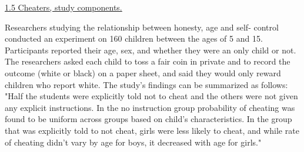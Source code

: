 \documentclass[10pt,letterpaper,unboxed,cm]{exam}
\begin{document}
\begin{questions}



	\question \underline{1.5 Cheaters, study components.}

    Researchers studying the relationship between honesty, age and self- control conducted an experiment on 160 children between the ages of 5 and 15. Participants reported their age, sex, and whether they were an only child or not. The researchers asked each child to toss a fair coin in private and to record the outcome (white or black) on a paper sheet, and said they would only reward children who report white. The study's findings can be summarized as follows: "Half the students were explicitly told not to cheat and the others were not given any explicit instructions. In the no instruction group probability of cheating was found to be uniform across groups based on child's characteristics. In the group that was explicitly told to not cheat, girls were less likely to cheat, and while rate of cheating didn't vary by age for boys, it decreased with age for girls."
    

\end{questions}
\end{document}
